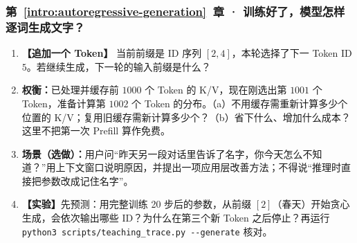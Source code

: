 \subsubsection*{第~\ref*{intro:autoregressive-generation}~章 · 训练好了，模型怎样逐词生成文字？}
\begin{enumerate}[label={},leftmargin=4.8em,itemsep=4pt]
\item[\textbf{C-086.}] \leavevmode{}\label{exercise:C-086}\label{exercise:generation-prefix-append}\textbf{【追加一个 Token】} 当前前缀是 ID 序列 $[2,4]$，本轮选择了下一 Token ID $5$。若继续生成，下一轮的输入前缀是什么？
\item[\textbf{C-087.}] \leavevmode{}\label{exercise:C-087}\label{exercise:cached-next-token}\textbf{权衡：}已处理并缓存前 $1000$ 个 Token 的 K/V，现在刚选出第 $1001$ 个 Token，准备计算第 $1002$ 个 Token 的分布。（a）不用缓存需重新计算多少个位置的 K/V；复用旧缓存需新计算多少个？（b）省下什么、增加什么成本？这里不把第一次 Prefill 算作免费。
\item[\textbf{C-088.}] \leavevmode{}\label{exercise:C-088}\label{exercise:context-window-memory}\textbf{场景（选做）：}用户问“昨天另一段对话里告诉了名字，你今天怎么不知道？”用上下文窗口说明原因，并提出一项应用层改善方法；不得说“推理时直接把参数改成记住名字”。
\item[\textbf{C-089.}] \leavevmode{}\label{exercise:C-089}\label{exercise:greedy-generation}\textbf{【实验】}先预测：用完整训练 20 步后的参数，从前缀 $[2]$（春天）开始贪心生成，会依次输出哪些 ID？为什么在第三个新 Token 之后停止？再运行 \texttt{python3 scripts/teaching\_trace.py -{}-generate} 核对。
\end{enumerate}
